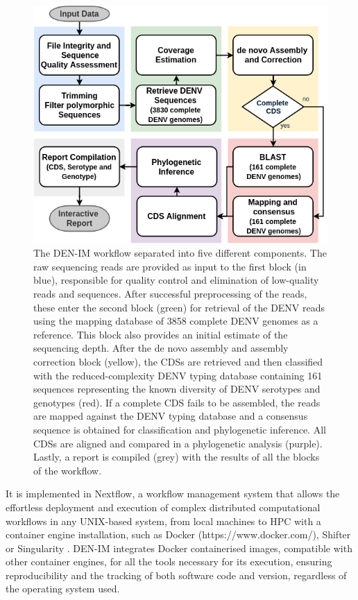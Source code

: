 \begin{figure}[h!]
\centering
\includegraphics[width=\textwidth]{figures/chapter 4/Figure1_DEN-IM_Diagram.png}
\caption{The DEN-IM workflow separated into five different components. The raw sequencing reads are provided as input to the first block (in blue), responsible for quality control and elimination of low-quality reads and sequences. After successful preprocessing of the reads, these enter the second block (green) for retrieval of the DENV reads using the mapping database of 3858 complete DENV genomes as a reference. This block also provides an initial estimate of the sequencing depth. After the de novo assembly and assembly correction block (yellow), the CDSs are retrieved and then classified with the reduced-complexity DENV typing database containing 161 sequences representing the known diversity of DENV serotypes and genotypes (red). If a complete CDS fails to be assembled, the reads are mapped against the DENV typing database and a consensus sequence is obtained for classification and phylogenetic inference. All CDSs are aligned and compared in a phylogenetic analysis (purple). Lastly, a report is compiled (grey) with the results of all the blocks of the workflow.}
\label{fig:chap4_figure1}
\end{figure}

It is implemented in Nextflow, a workflow management system that allows the effortless deployment and execution of complex distributed computational workflows in any UNIX-based system, from local machines to \ac{HPC} with a container engine installation, such as Docker (https://www.docker.com/), Shifter \citep{gerhardt_shifter_2017} or Singularity \citep{kurtzer_singularity_2017}. DEN-IM integrates Docker containerised images, compatible with other container engines, for all the tools necessary for its execution, ensuring reproducibility and the tracking of both software code and version, regardless of the operating system used. 

